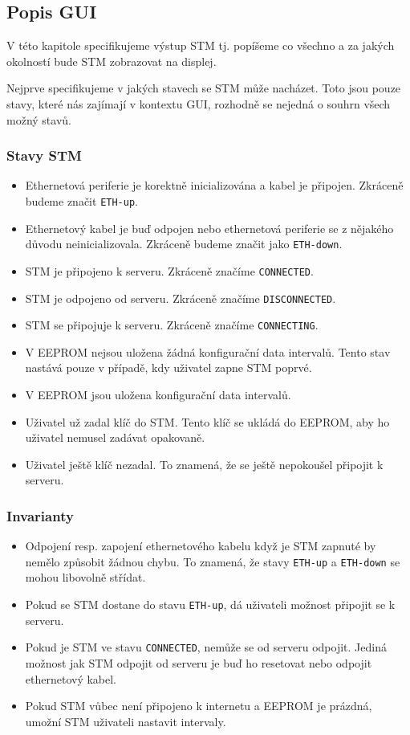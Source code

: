 
\subsection{Popis GUI} \label{popis-gui}
V této kapitole specifikujeme výstup STM tj. popíšeme co všechno a za jakých okolností
bude STM zobrazovat na displej.

Nejprve specifikujeme v jakých stavech se STM může nacházet.
Toto jsou pouze stavy, které nás zajímají v kontextu GUI, rozhodně se nejedná o souhrn všech možný stavů.
\subsubsection{Stavy STM}
\begin{itemize}
  \item Ethernetová periferie je korektně inicializována a kabel je připojen. Zkráceně budeme
        značit \texttt{ETH-up}.
  \item Ethernetový kabel je buď odpojen nebo ethernetová periferie se z nějakého důvodu
        neinicializovala. Zkráceně budeme značit jako \texttt{ETH-down}.
  \item STM je připojeno k serveru. Zkráceně značíme \texttt{CONNECTED}.
  \item STM je odpojeno od serveru. Zkráceně značíme \texttt{DISCONNECTED}.
  \item STM se připojuje k serveru. Zkráceně značíme \texttt{CONNECTING}.
  \item V EEPROM nejsou uložena žádná konfigurační data intervalů. Tento stav nastává pouze v případě,
        kdy uživatel zapne STM poprvé.
  \item V EEPROM jsou uložena konfigurační data intervalů.
  \item Uživatel už zadal klíč do STM. Tento klíč se ukládá do EEPROM, aby ho uživatel
        nemusel zadávat opakovaně.
  \item Uživatel ještě klíč nezadal. To znamená, že se ještě nepokoušel připojit k serveru.
\end{itemize}

\subsubsection{Invarianty}
\begin{itemize}
  \item Odpojení resp. zapojení ethernetového kabelu když je STM zapnuté by nemělo způsobit žádnou chybu.
    To znamená, že stavy \texttt{ETH-up} a \texttt{ETH-down} se mohou libovolně střídat.
  \item Pokud se STM dostane do stavu \texttt{ETH-up}, dá uživateli možnost připojit se k serveru.
  \item Pokud je STM ve stavu \texttt{CONNECTED}, nemůže se od serveru odpojit.
    Jediná možnost jak STM odpojit od serveru je buď ho resetovat nebo odpojit ethernetový kabel.
  \item Pokud STM vůbec není připojeno k internetu a EEPROM je prázdná, umožní STM uživateli nastavit
    intervaly.
\end{itemize}

